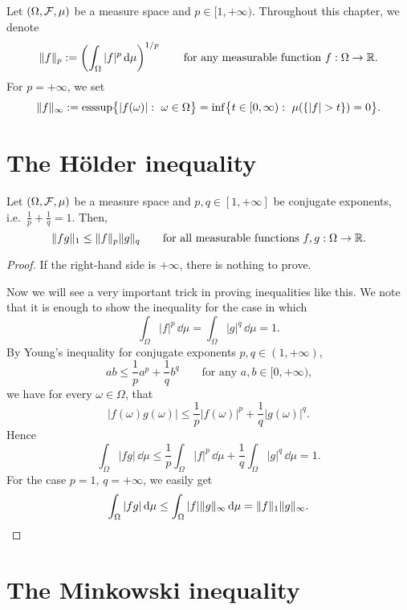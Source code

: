 Let $(\Omega,\mathcal F,\mu)$ be a measure space and $p\in[1,+\infty)$. Throughout this chapter, we denote
\[
	\|f\|_p := \left(\int_\Omega |f|^p\,\mathrm{d}\mu\right)^{1/p}\qquad \text{for any measurable function $f:\Omega\to\mathbb R$}.
\]
For $p=+\infty$, we set
\[
\|f\|_{\infty} := \operatorname{esssup} \bigl\{ |f(\omega)| : \ \omega \in \Omega \bigr\} = \inf\bigl\{t \in [0,\infty) : \ \mu(\{ |f| > t\}) = 0 \bigr\}.
\]

\section{The H\"older inequality}

\begin{proposition} Let $(\Omega,\mathcal F,\mu)$ be a measure space and $p,q\in[1,+\infty]$ be conjugate exponents, i.e.\ $\frac{1}{p}+\frac{1}{q}=1$. Then,
\[
	\|f g \|_1 \leq \|f\|_p\|g\|_q\qquad\text{for all measurable functions $f,g:\Omega\to\mathbb R$.}
\]
\end{proposition}

\begin{proof}
If the right-hand side is $+\infty$, there is nothing to prove. 

Now we will see a very important trick in proving inequalities like this. We note that it is enough to show the inequality for the case in which
\[
\int_\Omega |f|^p \,\dd \mu = \int_\Omega |g|^q \,\dd \mu = 1.
\]
By Young's inequality for conjugate exponents $p,q\in(1,+\infty)$,
\[
	ab \le \frac{1}{p}a^p + \frac{1}{q} b^q\qquad\text{for any $a,b\in[0,+\infty)$,}
\] 
we have for every $\omega \in \Omega$, that
\[
|f(\omega) g(\omega)| \leq \frac{1}{p}|f(\omega)|^p  + \frac{1}{q} |g(\omega)|^q.
\]
Hence
\[
\int_\Omega |fg|\,\dd \mu \leq \frac{1}{p} \int_\Omega |f|^p \,\dd \mu + \frac{1}{q} \int_\Omega |g|^q \,\dd \mu = 1.
\]
For the case $p=1$, $q=+\infty$, we easily get
\[
	\int_\Omega |fg|\,\mathrm{d}\mu \le \int_\Omega |f|\|g\|_\infty\,\mathrm{d}\mu = \|f\|_1\|g\|_\infty.\qedhere
\]
\end{proof}

\section{The Minkowski inequality}

